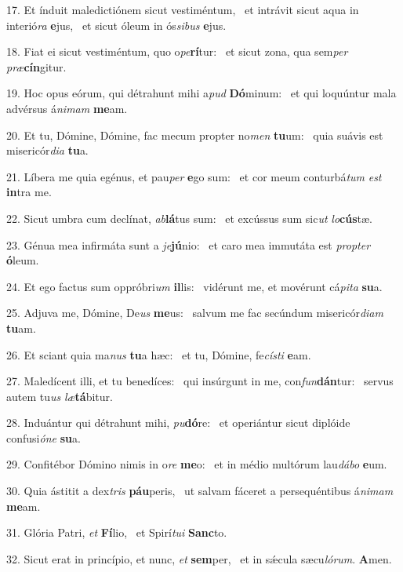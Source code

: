 17. Et índuit maledictiónem sicut vestiméntum, \dag\  et intrávit sicut aqua in interió\textit{ra} \textbf{e}jus, \ast\  et sicut óleum in ós\textit{si}\textit{bus} \textbf{e}jus.\

18. Fiat ei sicut vestiméntum, quo o\textit{pe}\textbf{rí}tur: \ast\  et sicut zona, qua sem\textit{per} \textit{præ}\textbf{cín}gitur.\

19. Hoc opus eórum, qui détrahunt mihi a\textit{pud} \textbf{Dó}minum: \ast\  et qui loquúntur mala advérsus á\textit{ni}\textit{mam} \textbf{me}am.\

20. Et tu, Dómine, Dómine, fac mecum propter no\textit{men} \textbf{tu}um: \ast\  quia suávis est misericór\textit{di}\textit{a} \textbf{tu}a.\

21. Líbera me quia egénus, et pau\textit{per} \textbf{e}go sum: \ast\  et cor meum conturbá\textit{tum} \textit{est} \textbf{in}tra me.\

22. Sicut umbra cum declínat, \textit{ab}\textbf{lá}tus sum: \ast\  et excússus sum sic\textit{ut} \textit{lo}\textbf{cús}tæ.\

23. Génua mea infirmáta sunt a \textit{je}\textbf{jú}nio: \ast\  et caro mea immutáta est \textit{prop}\textit{ter} \textbf{ó}leum.\

24. Et ego factus sum oppróbri\textit{um} \textbf{il}lis: \ast\  vidérunt me, et movérunt cá\textit{pi}\textit{ta} \textbf{su}a.\

25. Adjuva me, Dómine, De\textit{us} \textbf{me}us: \ast\  salvum me fac secúndum misericór\textit{di}\textit{am} \textbf{tu}am.\

26. Et sciant quia ma\textit{nus} \textbf{tu}a hæc: \ast\  et tu, Dómine, fe\textit{cís}\textit{ti} \textbf{e}am.\

27. Maledícent illi, et tu benedíces: \dag\  qui insúrgunt in me, con\textit{fun}\textbf{dán}tur: \ast\  servus autem tu\textit{us} \textit{læ}\textbf{tá}bitur.\

28. Induántur qui détrahunt mihi, \textit{pu}\textbf{dó}re: \ast\  et operiántur sicut diplóide confusi\textit{ó}\textit{ne} \textbf{su}a.\

29. Confitébor Dómino nimis in o\textit{re} \textbf{me}o: \ast\  et in médio multórum lau\textit{dá}\textit{bo} \textbf{e}um.\

30. Quia ástitit a dex\textit{tris} \textbf{páu}peris, \ast\  ut salvam fáceret a persequéntibus á\textit{ni}\textit{mam} \textbf{me}am.\

31. Glória Patri, \textit{et} \textbf{Fí}lio, \ast\  et Spirí\textit{tu}\textit{i} \textbf{Sanc}to.\

32. Sicut erat in princípio, et nunc, \textit{et} \textbf{sem}per, \ast\  et in sǽcula sæcu\textit{ló}\textit{rum}. \textbf{A}men.\

